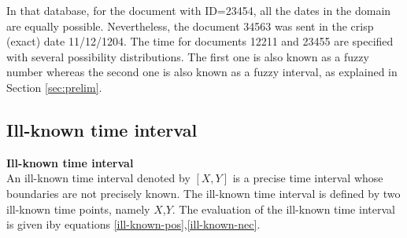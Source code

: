 In that database, for the document with ID=23454, all the dates in the domain are equally possible. Nevertheless, the document 34563 was sent in the crisp (exact) date 11/12/1204. The time for documents 12211 and 23455 are specified with several possibility distributions. The first one is also known as a fuzzy number whereas the second one is also known as a fuzzy interval, as explained in Section \ref{sec:prelim}.
 
 
 


\subsection{\label{subsec:ill-known-interval}Ill-known time interval}


\textbf{Ill-known time interval}\\
An ill-known time interval denoted by $\left[X, Y\right]$ is a precise time interval whose boundaries are not precisely known. The ill-known time interval is defined by two ill-known  time points, namely $X$,$Y$. The evaluation of the ill-known time interval is given iby equations \eqref{ill-known-pos},\eqref{ill-known-nec}.




% 




